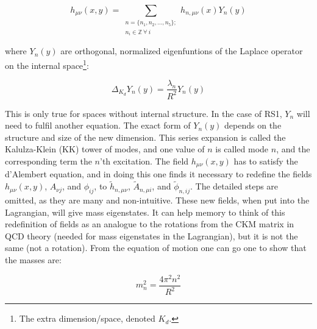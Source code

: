 \documentclass[11pt,a4paper]{article}
\begin{document}
\begin{equation}
	h_{\mu\nu}(x,y) = \sum_{\substack{n=\{n_1,n_2,\ldots,n_5\}; \\ n_i\in\mathbb{Z}\:\forall\:i}} h_{n,\mu\nu}(x)Y_n(y)
\end{equation}

where $Y_n(y)$ are orthogonal, normalized eigenfuntions of the Laplace operator on the internal space\footnote{The extra dimension/space, denoted $K_d$.}:

\begin{equation}
\Delta_{K_d}Y_n(y) = \frac{\lambda_n}{R^2}Y_n(y)
\end{equation}

This is only true for spaces without internal structure. In the case of RS1, $Y_n$ will need to fulfil another equation. The exact form of $Y_n(y)$ depends on the structure and size of the new dimension. This series expansion is called the Kalulza-Klein (KK) tower of modes, and one value of $n$ is called mode $n$, and the corresponding term the $n$'th excitation. The field $h_{\mu\nu}(x,y)$ has to satisfy the d'Alembert equation, and in doing this one finds it necessary to redefine the fields $h_{\mu\nu}(x,y)$, $A_{\nu j}$, and $\phi_{ij}$, to $\tilde{h}_{n,\mu\nu}$, $\tilde{A}_{n,\mu i}$, and $\tilde{\phi}_{n,ij}$. The detailed steps are omitted, as they are many and non-intuitive. These new fields, when put into the Lagrangian, will give mass eigenstates. It can help memory to think of this redefinition of fields as an analogue to the rotations from the CKM matrix in QCD theory (needed for mass eigenstates in the Lagrangian), but it is not the same (not a rotation). From the equation of motion one can go one to show that the masses are:

\begin{equation}
	m_n^2 = \frac{4\pi^2 n^2}{R^2}
	\label{eq:KK_masses}
\end{equation}

%
\end{document}
